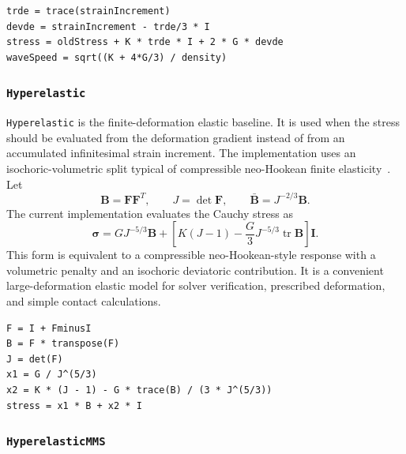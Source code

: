 \begin{lstlisting}[caption={ElasticIsotropic stress update.},label={alg:elastic-isotropic-update},basicstyle=\ttfamily\small]
trde = trace(strainIncrement)
devde = strainIncrement - trde/3 * I
stress = oldStress + K * trde * I + 2 * G * devde
waveSpeed = sqrt((K + 4*G/3) / density)
\end{lstlisting}

\subsubsection{\texttt{Hyperelastic}}
\label{subsubsec:hyperelastic-model}

\texttt{Hyperelastic} is the finite-deformation elastic baseline.  It is used when the stress should be evaluated from the deformation gradient instead of from an accumulated infinitesimal strain increment.  The implementation uses an isochoric-volumetric split typical of compressible neo-Hookean finite elasticity~\cite{ogden1997,holzapfel2000}.  Let
\begin{equation}
  \mathbf{B}=\mathbf{F}\mathbf{F}^{T},
  \qquad
  J=\det\mathbf{F},
  \qquad
  \bar{\mathbf{B}}=J^{-2/3}\mathbf{B} .
\end{equation}
The current implementation evaluates the Cauchy stress as
\begin{equation}
  \boldsymbol{\sigma}
  = G J^{-5/3}\mathbf{B}
  + \left[K(J-1)-\frac{G}{3}J^{-5/3}\operatorname{tr}\mathbf{B}\right]\mathbf{I}.
  \label{eq:geos-hyperelastic-stress}
\end{equation}
This form is equivalent to a compressible neo-Hookean-style response with a volumetric penalty and an isochoric deviatoric contribution.  It is a convenient large-deformation elastic model for solver verification, prescribed deformation, and simple contact calculations.

\begin{lstlisting}[caption={Hyperelastic stress update.},label={alg:hyperelastic-update},basicstyle=\ttfamily\small]
F = I + FminusI
B = F * transpose(F)
J = det(F)
x1 = G / J^(5/3)
x2 = K * (J - 1) - G * trace(B) / (3 * J^(5/3))
stress = x1 * B + x2 * I
\end{lstlisting}

\subsubsection{\texttt{HyperelasticMMS}}
\label{subsubsec:hyperelastic-mms-model}

